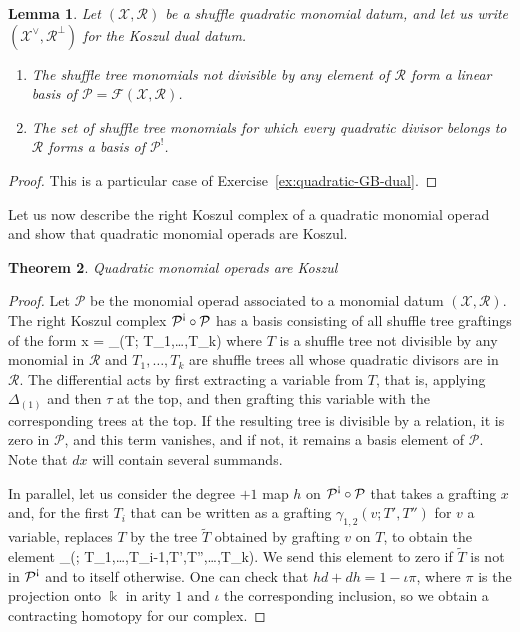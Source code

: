 \documentclass[fleqn, a4paper, twoside]{article}
\makeatletter
\newcommand{\antishriek}{\text{\raisebox{\depth}{\textexclamdown}}}
\newcommand{\0}{\langle 0\rangle}
\newcommand{\XX}{\mathcal{X}}
\newcommand{\RR}{\mathcal{R}}
\newcommand{\FF}{\mathcal{F}}
\newenvironment{tenumerate}{
 \begin{enumerate}
  \setlength{\itemsep}{0pt}
  \setlength{\parskip}{0pt}
}{\end{enumerate}}
\let\[\@undefined
\DeclareRobustCommand{\[}{\begin{equation}}%
\let\]\@undefined
\DeclareRobustCommand{\]}{\end{equation}}%
\theoremstyle{mytheorem}
\newtheorem{theorem}{Theorem}[section]
\newtheorem{lemma}[theorem]{Lemma}
\theoremstyle{introthm}
\theoremstyle{mydefinition}
\theoremstyle{mydefinition2}
\theoremstyle{plain} %
\newcommand{\?}{\,?\,}
\newcommand{\kk}{\Bbbk}
\newcommand{\PP}{{\mathcal{P}}}
\theoremstyle{mytheorem}
\theoremstyle{plain} %
\makeatother
\begin{document}
\begin{lemma}
Let $(\XX,\RR)$ be a shuffle quadratic monomial datum, and let us write
$(\XX^\vee,\RR^\perp)$ for the Koszul dual datum. 
\begin{tenumerate}
\item The shuffle tree monomials
not divisible by any element of $\RR$ form a linear basis of
$\PP = \FF(\XX,\RR)$.
\item  The set of shuffle tree monomials for which every
quadratic divisor belongs to $\RR$ forms a basis of $\PP^!$.
\end{tenumerate} 
\end{lemma}

\begin{proof}
This is a particular case of Exercise~\ref{ex:quadratic-GB-dual}.
\end{proof}

Let us now describe the right Koszul complex of a quadratic monomial operad
and show that quadratic monomial operads are Koszul.

\begin{theorem}
Quadratic monomial operads are Koszul
\end{theorem}

\begin{proof}
Let $\PP$ be the monomial operad associated to a monomial datum $(\XX,\RR)$.
The right Koszul complex $\PP^\antishriek\circ\PP$ has a basis consisting
of all shuffle tree graftings of the form
\[ x = \gamma_{\pi}(T; T_1,\ldots,T_k) 
\]
where $T$ is a shuffle tree not divisible by any monomial in $\RR$ and
$T_1,\ldots,T_k$ are shuffle trees all whose quadratic divisors are in $\RR$.
The differential acts by first extracting a variable from $T$, that is,
applying $\Delta_{(1)}$ and then $\tau$ at the top, and then grafting this
variable with the corresponding trees at the top. If the resulting tree 
is divisible by a relation, it is zero in $\PP$, and this term vanishes,
and if not, it remains a basis element of $\PP$. Note that $dx$ will 
contain several summands. 

In parallel, let us consider the degree $+1$ map $h$ on $\PP^\antishriek\circ\PP$
that takes a grafting $x$ and, for the first $T_i$ that can be written as a
grafting $\gamma_{1,2}(v ; T',T'')$ for $v$ a variable, replaces
$T$ by the tree $\tilde{T}$ obtained by grafting $v$ on $T$, to obtain the element
\[
\gamma_{\tilde{\pi}}(; T_1,\ldots,T_{i-1},T',T'',\ldots,T_k).
\]
We send this element to zero if $\tilde{T}$ is not in $\PP^\antishriek$
and to itself otherwise. One can check that $hd + dh = 1-\iota\pi$, 
where $\pi$ is the projection onto $\kk$ in arity $1$ and $\iota$ the 
corresponding inclusion, so we obtain a contracting homotopy for our complex.
\end{proof}
\end{document}
